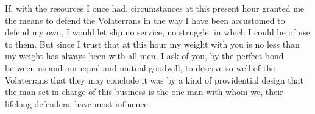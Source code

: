  If, with the resources I once had, circumstances at this present hour granted me the means to defend the Volaterrans in the way I have been accustomed to defend my own, I would let slip no service, no struggle, in which I could be of use to them. But since I trust that at this hour my weight with you is no less than my weight has always been with all men, I ask of you, by the perfect bond between us and our equal and mutual goodwill, to deserve so well of the Volaterrans that they may conclude it was by a kind of providential design that the man set in charge of this business is the one man with whom we, their lifelong defenders, have most influence.
